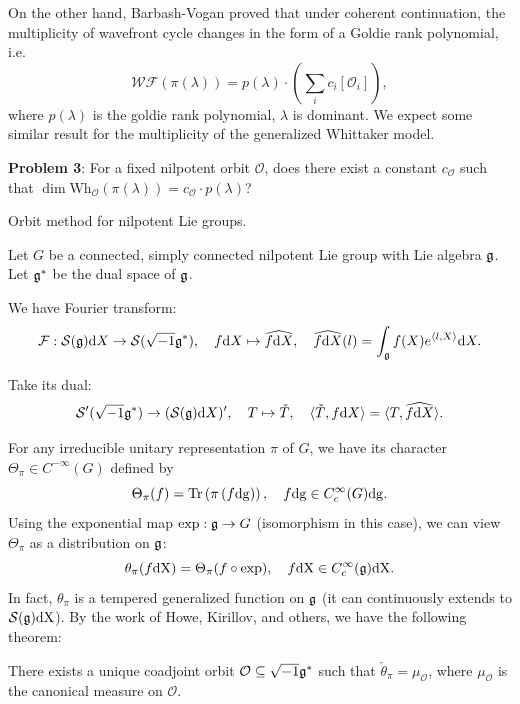 On the other hand, Barbash-Vogan \cite{BV80} proved that under coherent continuation, the multiplicity of wavefront cycle changes in the form of a Goldie rank polynomial, i.e.
\[
    \mathcal{WF}(\pi(\lambda)) = p(\lambda) \cdot (\sum\limits_{i} c_i [\mathcal{O}_i]),
\]
where $p(\lambda)$ is the goldie rank polynomial, $\lambda$ is dominant. We expect some similar result for the multiplicity of the generalized Whittaker model.

\textbf{Problem 3}: For a fixed nilpotent orbit $\mathcal{O}$, does there exist a constant $c_{\mathcal{O}}$ such that $\dim \mathrm{Wh}_{\mathcal{O}}(\pi(\lambda)) = c_{\mathcal{O}} \cdot p(\lambda)$?






Orbit method for nilpotent Lie groups.

Let $G$ be a connected, simply connected nilpotent Lie group with Lie algebra $\mathfrak{g}$. Let $\mathfrak{g}^*$ be the dual space of $\mathfrak{g}$.

We have Fourier transform:
\[
    \mathcal{F} : \mathcal{S}(\mathfrak{g})\mathrm{d} X \to \mathcal{S}(\sqrt{-1}\mathfrak{g}^*), \quad f\mathrm{d} X \mapsto \widehat{f\mathrm{d} X}, \quad \widehat{f\mathrm{d} X}(l) = \int_{\mathfrak{g}} f(X) e^{\langle l,X\rangle} \mathrm{d} X.
\]

Take its dual:
\[
    \mathcal{S}'(\sqrt{-1}\mathfrak{g}^*) \to (\mathcal{S}(\mathfrak{g})\mathrm{d} X)', \quad T \mapsto \check{T}, \quad \langle \check{T}, f\mathrm{d} X \rangle = \langle T, \widehat{f\mathrm{d} X} \rangle.
\]

For any irreducible unitary representation $\pi$ of $G$, we have its character $\Theta_\pi \in C^{-\infty}(G)$ defined by
\[\Theta_\pi(f) = \operatorname{Tr}\left(\pi\left(f\mathrm{dg}\right)\right), \quad f\mathrm{dg} \in C_c^\infty(G)\mathrm{dg}.\]
Using the exponential map $\exp : \mathfrak{g} \to G$ (isomorphism in this case), we can view $\Theta_\pi$ as a distribution on $\mathfrak{g}$:
\[\theta_\pi(f\mathrm{dX}) = \Theta_\pi(f \circ \exp), \quad f\mathrm{dX} \in C_{c}^{\infty}(\mathfrak{g})\mathrm{dX}.\]
In fact, $\theta_{\pi}$ is a tempered generalized function on $\mathfrak{g}$ (it can continuously extends to $\mathcal{S}(\mathfrak{g})\mathrm{dX}$).
By the work of Howe, Kirillov, and others, we have the following theorem:
\begin{thm}
    There exists a unique coadjoint orbit $\mathcal{O} \subseteq \sqrt{-1}\mathfrak{g}^*$ such that $\check{\theta}_\pi = \mu_{\mathcal{O}}$, where $\mu_{\mathcal{O}}$ is the canonical measure on $\mathcal{O}$.
\end{thm}

